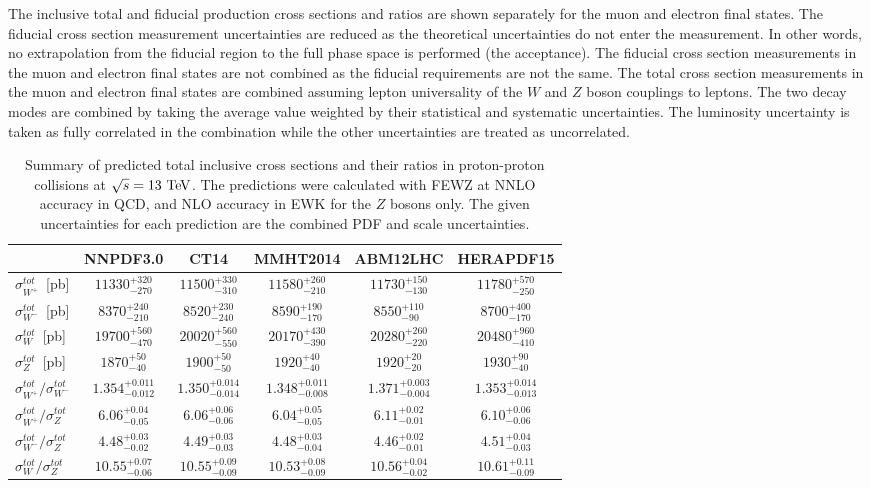 The inclusive total and fiducial production cross sections and ratios are shown separately for the muon and electron final states. The fiducial cross section measurement uncertainties are reduced as the theoretical uncertainties do not enter the measurement. In other words, no extrapolation from the fiducial region to the full phase space is performed (the acceptance). The fiducial cross section measurements in the muon and electron final states are not combined as the fiducial requirements are not the same. The total cross section measurements  in the muon and electron final states are combined assuming lepton universality of the $W$ and $Z$ boson couplings to leptons. The two decay modes are combined by taking the average value weighted by their statistical and systematic uncertainties. The luminosity uncertainty is taken as fully correlated in the combination while the other uncertainties are treated as uncorrelated.   
\begin{table*}[tbhp]
\centering
\begin {tabular} {lccccc}
\hline
 & \multicolumn{1}{c}{NNPDF3.0} & \multicolumn{1}{c}{CT14} & \multicolumn{1}{c}{MMHT2014} & \multicolumn{1}{c}{ABM12LHC} & \multicolumn{1}{c}{HERAPDF15} \\  \hline
$\sigma^{tot}_{W^+}$~[pb] & $11330^{+320}_{-270}$ & $11500^{+330}_{-310}$ & $11580^{+260}_{-210}$ & $11730^{+150}_{-130}$ & $11780^{+570}_{-250}$\\ 
$\sigma^{tot}_{W^-}$~[pb]  & $8370^{+240}_{-210}$ & $8520^{+230}_{-240}$ & $8590^{+190}_{-170}$ & $8550^{+110}_{-90}$ & $8700^{+400}_{-170}$\\ 
$\sigma^{tot}_{W}$~[pb]  & $19700^{+560}_{-470}$ & $20020^{+560}_{-550}$ & $20170^{+430}_{-390}$ & $20280^{+260}_{-220}$ & $20480^{+960}_{-410}$ \\ 
$\sigma^{tot}_{Z}$~[pb]  & $1870^{+50}_{-40}$ & $1900^{+50}_{-50}$ & $1920^{+40}_{-40}$ & $1920^{+20}_{-20}$ & $1930^{+90}_{-40}$ \\ 
$\sigma^{tot}_{W^+}/\sigma^{tot}_{W^-}$ & $1.354^{+0.011}_{-0.012}$ &
$1.350^{+0.014}_{-0.014}$ & $1.348^{+0.011}_{-0.008}$ &
$1.371^{+0.003}_{-0.004}$ & $1.353^{+0.014}_{-0.013}$\\
$\sigma^{tot}_{W^+}/\sigma^{tot}_{Z}$ & $6.06^{+0.04}_{-0.05}$ & $6.06^{+0.06}_{-0.06}$ & $6.04^{+0.05}_{-0.05}$ & $6.11^{+0.02}_{-0.01}$ & $6.10^{+0.06}_{-0.06}$ \\ 
$\sigma^{tot}_{W^-}/\sigma^{tot}_{Z}$ & $4.48^{+0.03}_{-0.02}$ & $4.49^{+0.03}_{-0.03}$ & $4.48^{+0.03}_{-0.04}$ & $4.46^{+0.02}_{-0.01}$ & $4.51^{+0.04}_{-0.03}$ \\ 
$\sigma^{tot}_{W}/\sigma^{tot}_{Z}$ & $10.55^{+0.07}_{-0.06}$ & $10.55^{+0.09}_{-0.09}$ & $10.53^{+0.08}_{-0.09}$ & $10.56^{+0.04}_{-0.02}$ & $10.61^{+0.11}_{-0.09}$ \\ 
\hline
\end{tabular}
\caption{ \label{tab:pdfXsec}
Summary of predicted total inclusive cross sections and their ratios in proton-proton collisions at $\sqrt{s}=13~\mathrm{Te\kern -0.1em V}$. The predictions were calculated with FEWZ at NNLO accuracy in QCD, and NLO accuracy in EWK for the $Z$ bosons only. The given uncertainties for each prediction are the combined PDF and scale uncertainties.}
\end{table*}
